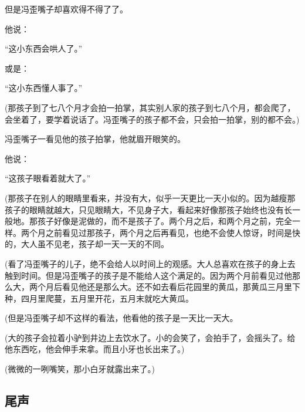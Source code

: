 \par 但是冯歪嘴子却喜欢得不得了了。
\par 他说：
\par “这小东西会哄人了。”
\par 或是：
\par “这小东西懂人事了。”
\par (那孩子到了七八个月才会拍一拍掌，其实别人家的孩子到七八个月，都会爬了，会坐着了，要学着说话了。冯歪嘴子的孩子都不会，只会拍一拍掌，别的都不会。)
\par 冯歪嘴子一看见他的孩子拍掌，他就眉开眼笑的。
\par 他说：
\par “这孩子眼看着就大了。”
\par (那孩子在别人的眼睛里看来，并没有大，似乎一天更比一天小似的。因为越瘦那孩子的眼睛就越大，只见眼睛大，不见身子大，看起来好像那孩子始终也没有长一般地。那孩子好像是泥做的，而不是孩子了。两个月之后，和两个月之前，完全一样。两个月之前看见过那孩子，两个月之后再看见，也绝不会使人惊讶，时间是快的，大人虽不见老，孩子却一天一天的不同。
\par (看了冯歪嘴子的儿子，绝不会给人以时间上的观感。大人总喜欢在孩子的身上去触到时间。但是冯歪嘴子的孩子是不能给人这个满足的。因为两个月前看见过他那么大，两个月后看见他还是那么大。还不如去看后花园里的黄瓜，那黄瓜三月里下种，四月里爬蔓，五月里开花，五月末就吃大黄瓜。
\par (但是冯歪嘴子却不这样的看法，他看他的孩子是一天比一天大。
\par (大的孩子会拉着小驴到井边上去饮水了。小的会笑了，会拍手了，会摇头了。给他东西吃，他会伸手来拿。而且小牙也长出来了。)
\par (微微的一咧嘴笑，那小白牙就露出来了。)




\subsection{尾声}




